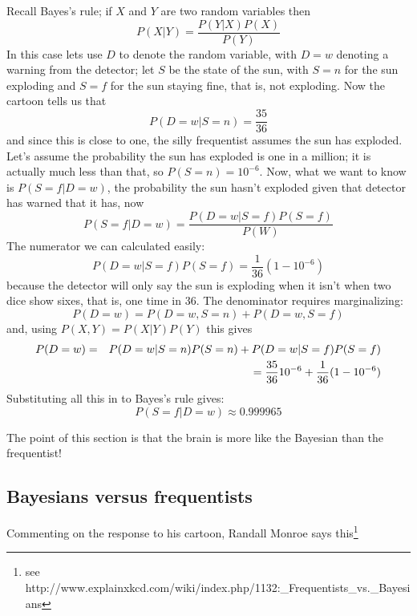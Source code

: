 \documentclass[12pt]{article}
\begin{document}
Recall Bayes's rule; if $X$ and $Y$ are two random variables then
\begin{equation}
P(X|Y)=\frac{P(Y|X)P(X)}{P(Y)}
\end{equation}
In this case lets use $D$ to denote the random variable, with $D=w$
denoting a warning from the detector; let $S$ be the state of the sun,
with $S=n$ for the sun exploding and $S=f$ for the sun staying fine,
that is, not exploding. Now the cartoon tells us that
\begin{equation}
P(D=w|S=n)=\frac{35}{36}
\end{equation}
and since this is close to one, the silly frequentist assumes the sun
has exploded. Let's assume the probability the sun has exploded is one
in a million; it is actually much less than that, so
$P(S=n)=10^{-6}$. Now, what we want to know is $P(S=f|D=w)$, the probability the sun hasn't exploded given that detector has warned that it has, now
\begin{equation}
P(S=f|D=w)=\frac{P(D=w|S=f)P(S=f)}{P(W)}
\end{equation}
The numerator we can calculated easily:
\begin{equation}
P(D=w|S=f)P(S=f)=\frac{1}{36}(1-10^{-6})
\end{equation}
because the detector will only say the sun is exploding when it isn't when two dice show sixes, that is, one time in 36. The denominator requires marginalizing:
\begin{equation}
P(D=w)=P(D=w,S=n)+P(D=w,S=f)
\end{equation}
and, using $P(X,Y)=P(X|Y)P(Y)$ this gives
\begin{eqnarray}
P(D=w) &=& P(D=w|S=n)P(S=n)+P(D=w|S=f)P(S=f)\cr
&&=\frac{35}{36}10^{-6}+\frac{1}{36}(1-10^{-6})
\end{eqnarray}
Substituting all this in to Bayes's rule gives:
\begin{equation}
P(S=f|D=w)\approx 0.999965
\end{equation}

The point of this section is that the brain is more like the Bayesian than the frequentist!

\subsection*{Bayesians versus frequentists}

Commenting on the response to his cartoon, Randall Monroe says this\footnote{see http://www.explainxkcd.com/wiki/index.php/1132:\_Frequentists\_vs.\_Bayesians}
\end{document}
